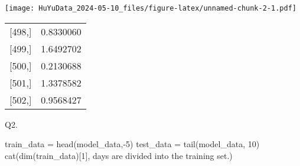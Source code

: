 \documentclass[
]{article}
\newenvironment{Shaded}{\begin{snugshade}}{\end{snugshade}}
\newcommand{\CommentTok}[1]{\textcolor[rgb]{0.56,0.35,0.01}{\textit{#1}}}
\newcommand{\DecValTok}[1]{\textcolor[rgb]{0.00,0.00,0.81}{#1}}
\newcommand{\FunctionTok}[1]{\textcolor[rgb]{0.00,0.00,0.00}{#1}}
\newcommand{\NormalTok}[1]{#1}
\newcommand{\OtherTok}[1]{\textcolor[rgb]{0.56,0.35,0.01}{#1}}
\newcommand{\SpecialCharTok}[1]{\textcolor[rgb]{0.00,0.00,0.00}{#1}}
\newcommand{\StringTok}[1]{\textcolor[rgb]{0.31,0.60,0.02}{#1}}
\begin{document}
\texttt{[image: HuYuData\_2024-05-10\_files/figure-latex/unnamed-chunk-2-1.pdf]}

\begin{Shaded}
\end{Shaded}

\begin{longtable}[]{@{}lr@{}}
\toprule()
\endhead
{[}498,{]} & 0.8330060 \\
{[}499,{]} & 1.6492702 \\
{[}500,{]} & 0.2130688 \\
{[}501,{]} & 1.3378582 \\
{[}502,{]} & 0.9568427 \\
\bottomrule()
\end{longtable}

Q2.

\begin{Shaded}
\begin{Highlighting}[]
\NormalTok{train\_data }\OtherTok{=} \FunctionTok{head}\NormalTok{(model\_data,}\SpecialCharTok{{-}}\DecValTok{5}\NormalTok{)}
\NormalTok{test\_data }\OtherTok{=} \FunctionTok{tail}\NormalTok{(model\_data, }\DecValTok{10}\NormalTok{)}
\FunctionTok{cat}\NormalTok{(}\FunctionTok{dim}\NormalTok{(train\_data)[}\DecValTok{1}\NormalTok{], }\StringTok{\textquotesingle{}days are divided into the training set.\textquotesingle{}}\NormalTok{)}
\end{Highlighting}
\end{Shaded}
\end{document}
